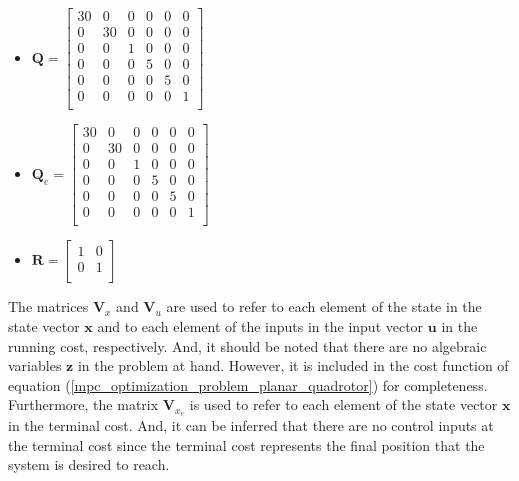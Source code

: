 \documentclass{thesisreport}
\begin{document}
\begin{multicols}{2}
\begin{itemize}
            \end{itemize}
			\columnbreak
            \begin{itemize}
            	\item $\bm{Q} = \begin{bmatrix}
                 30 & 0  & 0 & 0 & 0 & 0 \\
                 0 & 30  & 0 & 0 & 0 & 0 \\
                 0 & 0  & 1 & 0 & 0 & 0 \\
                 0 & 0  & 0 & 5 & 0 & 0 \\
                 0 & 0  & 0 & 0 & 5 & 0 \\
                 0 & 0  & 0 & 0 & 0 & 1 \\
                \end{bmatrix}$
                
                \item $\bm{Q}_e = \begin{bmatrix}
                 30 & 0  & 0 & 0 & 0 & 0 \\
                 0 & 30  & 0 & 0 & 0 & 0 \\
                 0 & 0  & 1 & 0 & 0 & 0 \\
                 0 & 0  & 0 & 5 & 0 & 0 \\
                 0 & 0  & 0 & 0 & 5 & 0 \\
                 0 & 0  & 0 & 0 & 0 & 1 \\
                \end{bmatrix}$
                
                \item $\bm{R} = \begin{bmatrix}
                1 & 0 \\
                0 & 1 \\
                \end{bmatrix}$
                
            \end{itemize}
\end{multicols}

The matrices $\bm{V}_x$ and  $\bm{V}_u$ are used to refer to each element of the state in the state vector $\bm{x}$ and to each element of the inputs in the input vector $\bm{u}$ in the running cost, respectively. And, it should be noted that there are no algebraic variables $\bm{z}$ in the problem at hand. However, it is included in the cost function of equation (\ref{mpc_optimization_problem_planar_quadrotor}) for completeness. Furthermore, the matrix $\bm{V}_{x_e}$ is used to refer to each element of the state vector $\bm{x}$ in the terminal cost. And, it can be inferred that there are no control inputs at the terminal cost since the terminal cost represents the final position that the system is desired to reach. \\
\end{document}
